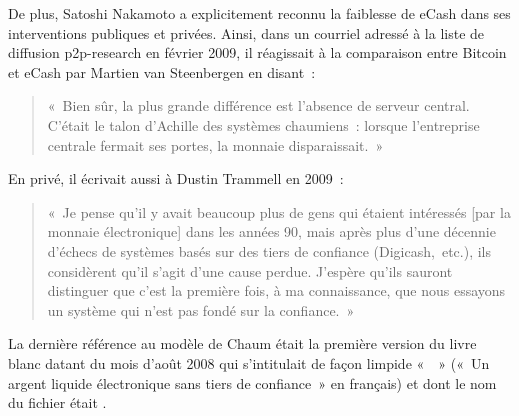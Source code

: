 De plus, Satoshi Nakamoto a explicitement reconnu la faiblesse de eCash dans ses interventions publiques et privées. Ainsi, dans un courriel adressé à la liste de diffusion p2p-research en février 2009, il réagissait à la comparaison entre Bitcoin et eCash par Martien van Steenbergen en disant~:

\begin{quote}
«~Bien sûr, la plus grande différence est l'absence de serveur central. C'était le talon d'Achille des systèmes chaumiens~: lorsque l'entreprise centrale fermait ses portes, la monnaie disparaissait.~»
\end{quote} %

En privé, il écrivait aussi à Dustin Trammell en 2009~:

\begin{quote}
«~Je pense qu'il y avait beaucoup plus de gens qui étaient intéressés [par la monnaie électronique] dans les années 90, mais après plus d'une décennie d'échecs de systèmes basés sur des tiers de confiance (Digicash,~etc.), ils considèrent qu'il s'agit d'une cause perdue. J'espère qu'ils sauront distinguer que c'est la première fois, à ma connaissance, que nous essayons un système qui n'est pas fondé sur la confiance.~»
\end{quote}

La dernière référence au modèle de Chaum était la première version du livre blanc datant du mois d'août 2008 qui s'intitulait de façon limpide «~~» («~Un argent liquide électronique sans tiers de confiance~» en français) et dont le nom du fichier était .

